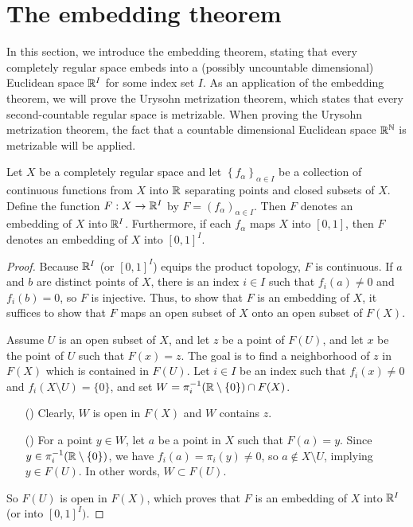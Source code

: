 \section{The embedding theorem}

In this section, we introduce the embedding theorem, stating that every completely regular space embeds into a (possibly uncountable dimensional) Euclidean space ${\mathbb{R}}^I$ for some index set $I$.
As an application of the embedding theorem, we will prove the Urysohn metrization theorem, which states that every second-countable regular space is metrizable.
When proving the Urysohn metrization theorem, the fact that a countable dimensional Euclidean space ${\mathbb{R}}^{\mathbb{N}}$ is metrizable will be applied.

\begin{thm}
    Let $X$ be a completely regular space and let $\left\{f_\alpha\right\}_{\alpha\in I}$ be a collection of continuous functions from $X$ into ${\mathbb{R}}$ separating points and closed subsets of $X$.
    Define the function $F: X\rightarrow{\mathbb{R}}^I$ by $F=(f_\alpha)_{\alpha\in I}$.
    Then $F$ denotes an embedding of $X$ into ${\mathbb{R}}^I$.
    Furthermore, if each $f_\alpha$ maps $X$ into $[0, 1]$, then $F$ denotes an embedding of $X$ into $[0, 1]^I$.
\end{thm}
\begin{proof}
    Because ${\mathbb{R}}^I$ (or $[0, 1]^I$) equips the product topology, $F$ is continuous.
    If $a$ and $b$ are distinct points of $X$, there is an index $i\in I$ such that $f_i(a)\neq 0$ and $f_i(b)=0$, so $F$ is injective.
    Thus, to show that $F$ is an embedding of $X$, it suffices to show that $F$ maps an open subset of $X$ onto an open subset of $F(X)$.
    
    Assume $U$ is an open subset of $X$, and let $z$ be a point of $F(U)$, and let $x$ be the point of $U$ such that $F(x)=z$.
    The goal is to find a neighborhood of $z$ in $F(X)$ which is contained in $F(U)$.
    Let $i\in I$ be an index such that $f_i(x)\neq 0$ and $f_i(X\setminus U)=\{0\}$, and set $W=\pi_i^{-1}({\mathbb{R}}\setminus\{0\})\cap F(X)$.
    \begin{enumerate}
        \item[(\romannumeral 1)]
        {
            Clearly, $W$ is open in $F(X)$ and $W$ contains $z$.
        }
        \item[(\romannumeral 2)]
        {
            For a point $y\in W$, let $a$ be a point in $X$ such that $F(a)=y$.
            Since $y\in\pi_i^{-1}({\mathbb{R}}\setminus\{0\})$, we have $f_i(a)=\pi_i(y)\neq 0$, so $a\notin X\setminus U$, implying $y\in F(U)$.
            In other words, $W\subset F(U)$.
        }
    \end{enumerate}
    So $F(U)$ is open in $F(X)$, which proves that $F$ is an embedding of $X$ into ${\mathbb{R}}^I$ (or into $[0, 1]^I)$.
\end{proof}

